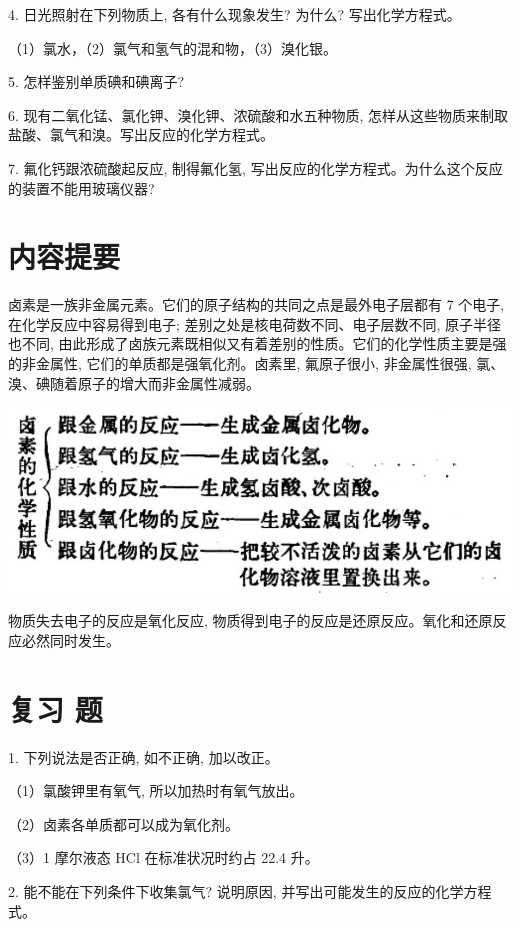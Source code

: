\documentclass[10pt]{article}
\begin{document}
4. 日光照射在下列物质上, 各有什么现象发生? 为什么? 写出化学方程式。

（1）氯水，（2）氯气和氢气的混和物，（3）溴化银。

5. 怎样鉴别单质碘和碘离子?

6. 现有二氧化锰、氯化钾、溴化钾、浓硫酸和水五种物质, 怎样从这些物质来制取盐酸、氯气和溴。写出反应的化学方程式。

7. 氟化钙跟浓硫酸起反应, 制得氟化氢, 写出反应的化学方程式。为什么这个反应的装置不能用玻璃仪器?

\section*{内容提要}

卤素是一族非金属元素。它们的原子结构的共同之点是最外电子层都有 7 个电子, 在化学反应中容易得到电子; 差别之处是核电荷数不同、电子层数不同, 原子半径也不同, 由此形成了卤族元素既相似又有着差别的性质。它们的化学性质主要是强的非金属性, 它们的单质都是强氧化剂。卤素里, 氟原子很小, 非金属性很强, 氯、溴、碘随着原子的增大而非金属性减弱。

\begin{center}
\includegraphics[max width=1.0\textwidth]{images/01912d0f-097c-7e75-8f32-4f326cd86c9f_55_279371.jpg}
\end{center}

物质失去电子的反应是氧化反应, 物质得到电子的反应是还原反应。氧化和还原反应必然同时发生。

\section*{复习 题}

1. 下列说法是否正确, 如不正确, 加以改正。

（1）氯酸钾里有氧气, 所以加热时有氧气放出。

（2）卤素各单质都可以成为氧化剂。

（3）1 摩尔液态 \(\mathrm{{HCl}}\) 在标准状况时约占 22.4 升。

2. 能不能在下列条件下收集氯气? 说明原因, 并写出可能发生的反应的化学方程式。
\end{document}
